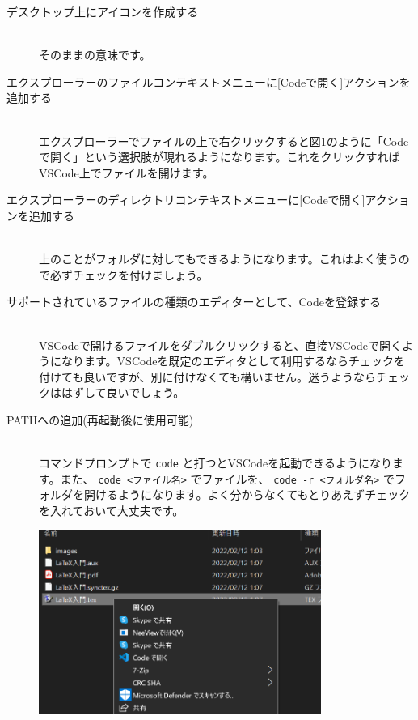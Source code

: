 \begin{description}
    \item[デスクトップ上にアイコンを作成する]\mbox{}\\
          そのままの意味です。
    \item[エクスプローラーのファイルコンテキストメニューに\textrm{[}Codeで開く\textrm{]}アクションを追加する]\mbox{}\\
          エクスプローラーでファイルの上で右クリックすると図\ref{fig:vscheck1}のように「Codeで開く」という選択肢が現れるようになります。これをクリックすればVSCode上でファイルを開けます。
    \item[エクスプローラーのディレクトリコンテキストメニューに\textrm{[}Codeで開く\textrm{]}アクションを追加する]\mbox{}\\
          上のことがフォルダに対してもできるようになります。これはよく使うので必ずチェックを付けましょう。
    \item[サポートされているファイルの種類のエディターとして、Codeを登録する]\mbox{}\\
          VSCodeで開けるファイルをダブルクリックすると、直接VSCodeで開くようになります。VSCodeを既定のエディタとして利用するならチェックを付けても良いですが、別に付けなくても構いません。迷うようならチェックははずして良いでしょう。
    \item[PATHへの追加(再起動後に使用可能)]\mbox{}\\
          コマンドプロンプトで \verb|code| と打つとVSCodeを起動できるようになります。また、 \verb*|code <ファイル名>| でファイルを、 \verb*|code -r <フォルダ名>| でフォルダを開けるようになります。よく分からなくてもとりあえずチェックを入れておいて大丈夫です。
\end{description}
\begin{figure}[H]
    \centering
    \includegraphics[height=60mm]{img/vscodecheck1.png}
    \caption{}
    \label{fig:vscheck1}
\end{figure}

